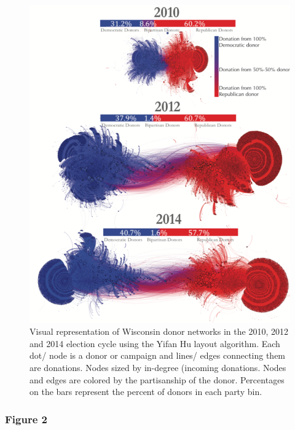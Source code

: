 \documentclass[12pt,]{article}
\begin{document}
\begin{figure}

{\centering \includegraphics[width=0.73\linewidth]{../figures/fig1} 

}

\caption{Visual representation of Wisconsin donor networks in the 2010, 2012 and 2014 election cycle using the Yifan Hu layout algorithm. Each dot/ node is a donor or campaign and lines/ edges connecting them are donations. Nodes sized by in-degree (incoming donations. Nodes and edges are colored by the partisanship of the donor. Percentages on the bars represent the percent of donors in each party bin.}\label{fig:unnamed-chunk-11}
\end{figure}

\newpage

\hypertarget{figure-2}{%
\subsubsection{Figure 2}\label{figure-2}}
\end{document}
